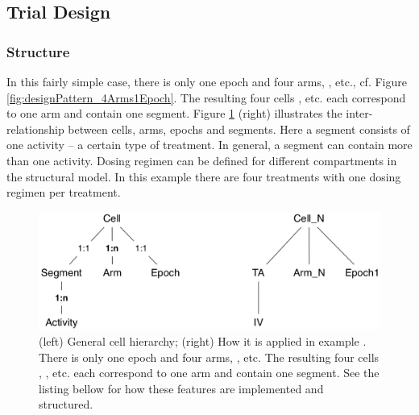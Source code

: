 
\subsection{Trial Design}
\subsubsection{Structure}

In this fairly simple case, there is only one epoch and four arms, ,  etc.,
cf. Figure \ref{fig:designPattern_4Arms1Epoch}.
The resulting four cells ,  etc. each correspond
to one arm and contain one segment.
Figure \ref{fig:CellSegmentEpochArm_example1} (right) illustrates the inter-relationship between
cells, arms, epochs and segments. Here a segment consists of one activity --
a certain type of treatment. In general, a segment can contain more
than one activity. Dosing regimen can be defined for different
compartments in the structural model. In this example there are four
treatments with one dosing regimen per treatment.

\begin{figure}[htbp!]
\centering
\includegraphics[width=0.7\linewidth]{pics/CellSegmentEpochArm_example1}
\caption{(left) General cell hierarchy; (right) How it is applied in example .
There is only one epoch and four arms, ,  etc.
The resulting four cells , , etc. each correspond
to one arm and contain one segment. See the listing bellow for how
these features are implemented and structured.}
\label{fig:CellSegmentEpochArm_example1}
\end{figure}

